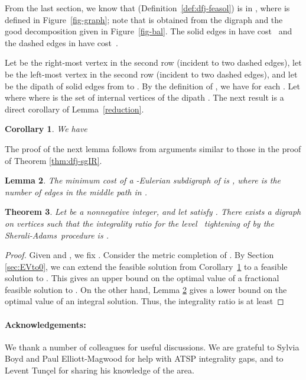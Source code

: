 \documentclass[11pt]{article}
\newtheorem{theorem}{Theorem}[section]
\newtheorem{lemma}[theorem]{Lemma}
\newtheorem{corollary}[theorem]{Corollary}
\newcommand{\sa}{\textsf{Sherali-Adams}}
\begin{document}
From the last section, we know that 
(Definition~\ref{def:dfj-feasol}) is in
, where  is defined in
Figure~\ref{fig-graph};
note that  is obtained from the
digraph and the good decomposition given in Figure~\ref{fig-bal}.
The solid edges in  have cost~ and the
dashed edges in  have cost~.

Let  be the right-most vertex in the second row
	(incident to two dashed edges),
let  be the  left-most vertex in the second row
	(incident to two dashed edges),
and let  be the dipath of solid edges from  to .
By the definition of , we have
 for each . Let
 where  where
 is the set of internal vertices of the dipath . The next
result is a direct corollary of Lemma~\ref{reduction}.

\begin{corollary}\label{thm:PATSP-feasol}
We have 

\end{corollary}

The proof of the next lemma follows from arguments similar to
those in the proof of Theorem \ref{thm:dfj-sgIR}.
\begin{lemma}\label{PATSP:is-lowerbound}
The minimum cost of a -Eulerian subdigraph of  is
, where  is the number of edges in
the middle path in .
\end{lemma}

\begin{theorem}
Let  be a nonnegative integer, and let 
satisfy .
There exists a digraph on  vertices
such that the integrality ratio for
the level~ tightening of  by the \sa\ procedure is
.
\end{theorem}
\begin{proof}
Given  and , we
fix .
Consider the metric completion  of . By Section
\ref{sec:EVto0}, we can extend the feasible solution from 
Corollary~\ref{thm:PATSP-feasol} to a feasible solution to
. This gives an upper bound
on the optimal value of a fractional feasible solution to
. On the other hand,
Lemma \ref{PATSP:is-lowerbound} gives a lower bound on
the optimal value of an integral solution.
Thus, the integrality ratio is at least


\end{proof}



\paragraph {Acknowledgements:}
We thank a number of colleagues for useful discussions.
We are grateful to Sylvia Boyd and Paul Elliott-Magwood
for help with ATSP integrality gaps, and to
Levent Tun\c{c}el for sharing his knowledge of the area.







\end{document}
